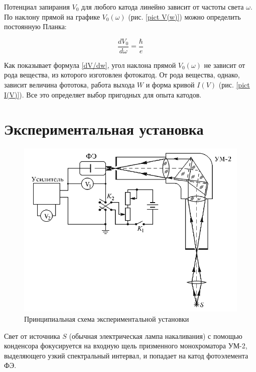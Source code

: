 	Потенциал запирания $V_0$ для любого катода линейно зависит от частоты света $\omega$. По наклону прямой на графике $V_0(\omega)$ (рис. \ref{pict V(w)}) можно определить постоянную Планка:
	
	\begin{equation}
        \label{dV/dw}
	    \dfrac{dV_0}{d\omega} = \dfrac{\hbar}{e}
	\end{equation}
	
	Как показывает формула \eqref{dV/dw}, угол наклона прямой $V_0(\omega) $ не зависит от рода вещества, из которого изготовлен фотокатод. От рода вещества, однако, зависит величина фототока, работа выхода $W$ и форма кривой $I(V)$ (рис. \ref{pict I(V)}). Все это определяет выбор пригодных для опыта катодов.

\section{Экспериментальная установка}

    \begin{figure}[h!]
        \centering
        \includegraphics[width = 12 cm]{images/exp_scheme}
        \caption{Принципиальная схема экспериментальной установки}
        \label{exp_scheme}
    \end{figure}

    Свет от источника $S$ (обычная электрическая лампа накаливания) с помощью конденсора фокусируется на входную щель призменного монохроматора УМ-2, выделяющего узкий спектральный интервал, и попадает на катод фотоэлемента ФЭ.

